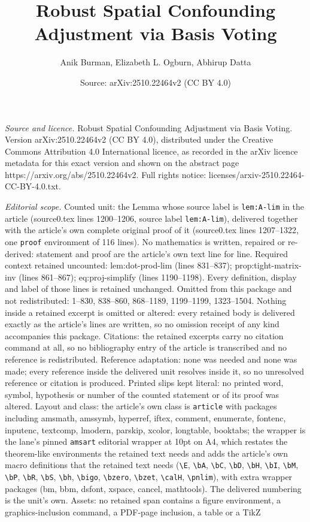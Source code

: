 \documentclass[10pt,a4paper]{amsart}
\title[Robust Spatial Confounding Adjustment via Basis Voting]{Robust Spatial Confounding Adjustment via Basis Voting}
\author{Anik Burman, Elizabeth L. Ogburn, Abhirup Datta}
\date{Source: arXiv:2510.22464v2 (CC BY 4.0)}
\begin{document}
\maketitle

\noindent\emph{Source and licence.} Robust Spatial Confounding Adjustment via Basis Voting. Version arXiv:2510.22464v2 (CC BY 4.0), distributed under the Creative Commons Attribution 4.0 International licence, as recorded in the arXiv licence metadata for this exact version and shown on the abstract page https://arxiv.org/abs/2510.22464v2. Full rights notice: licenses/arxiv-2510.22464-CC-BY-4.0.txt.\par\smallskip

\noindent\textit{Editorial scope.} Counted unit: the Lemma whose source label is \texttt{lem:A-lim} in the article (source0.tex lines 1200--1206, source label \texttt{lem:A-lim}), delivered together with the article's own complete original proof of it (source0.tex lines 1207--1322, one \texttt{proof} environment of 116 lines). No mathematics is written, repaired or re-derived: statement and proof are the article's own text line for line. Required context retained uncounted: lem:dot-prod-lim (lines 831--837); prop:tight-matrix-inv (lines 861--867); eq:proj-simplify (lines 1190--1198). Every definition, display and label of those lines is retained unchanged. Omitted from this package and not redistributed: 1--830, 838--860, 868--1189, 1199--1199, 1323--1504. Nothing inside a retained excerpt is omitted or altered: every retained body is delivered exactly as the article's lines are written, so no omission receipt of any kind accompanies this package. Citations: the retained excerpts carry no citation command at all, so no bibliography entry of the article is transcribed and no reference is redistributed. Reference adaptation: none was needed and none was made; every reference inside the delivered unit resolves inside it, so no unresolved reference or citation is produced. Printed slips kept literal: no printed word, symbol, hypothesis or number of the counted statement or of its proof was altered. Layout and class: the article's own class is \texttt{article} with packages including amsmath, amssymb, hyperref, iftex, comment, enumerate, fontenc, inputenc, textcomp, lmodern, parskip, xcolor, longtable, booktabs; the wrapper is the lane's pinned \texttt{amsart} editorial wrapper at 10pt on A4, which restates the theorem-like environments the retained text needs and adds the article's own macro definitions that the retained text needs (\texttt{\textbackslash E}, \texttt{\textbackslash bA}, \texttt{\textbackslash bC}, \texttt{\textbackslash bD}, \texttt{\textbackslash bH}, \texttt{\textbackslash bI}, \texttt{\textbackslash bM}, \texttt{\textbackslash bP}, \texttt{\textbackslash bR}, \texttt{\textbackslash bS}, \texttt{\textbackslash bh}, \texttt{\textbackslash bigo}, \texttt{\textbackslash bzero}, \texttt{\textbackslash bzet}, \texttt{\textbackslash calH}, \texttt{\textbackslash pnlim}), with extra wrapper packages (bm, bbm, dsfont, xspace, cancel, mathtools). The delivered numbering is the unit's own. Assets: no retained span contains a figure environment, a graphics-inclusion command, a PDF-page inclusion, a table or a TikZ 
\end{document}
